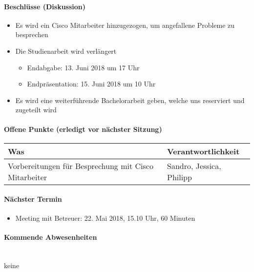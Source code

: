 \paragraph{Beschlüsse (Diskussion)}
\begin{itemize}	
	\item Es wird ein Cisco Mitarbeiter hinzugezogen, um angefallene Probleme zu besprechen
	\item Die Studienarbeit wird verlängert
	\begin{itemize}
		\item Endabgabe: 13. Juni 2018 um 17 Uhr
		\item Endpräsentation: 15. Juni 2018 um 10 Uhr
	\end{itemize}
	\item Es wird eine weiterführende Bachelorarbeit geben, welche uns reserviert und zugeteilt wird
\end{itemize}

\paragraph{Offene Punkte (erledigt vor nächster Sitzung)} \mbox{}

\begin{table}[H]
	\centering
	\begin{tabularx}{\textwidth}{X | p{4.5cm}}
		\rowcolor{gray!50}
		\textbf{Was} & \textbf{Verantwortlichkeit} \\
		\hline
		Vorbereitungen für Besprechung mit Cisco Mitarbeiter & Sandro, Jessica, Philipp \\
	\end{tabularx}
	\label{tab:my-label}
\end{table}

\paragraph{Nächster Termin}
\begin{itemize}	
	\item Meeting mit Betreuer: 22. Mai 2018, 15.10 Uhr, 60 Minuten
\end{itemize}

\paragraph{Kommende Abwesenheiten} \mbox{}\\
keine

\newpage


